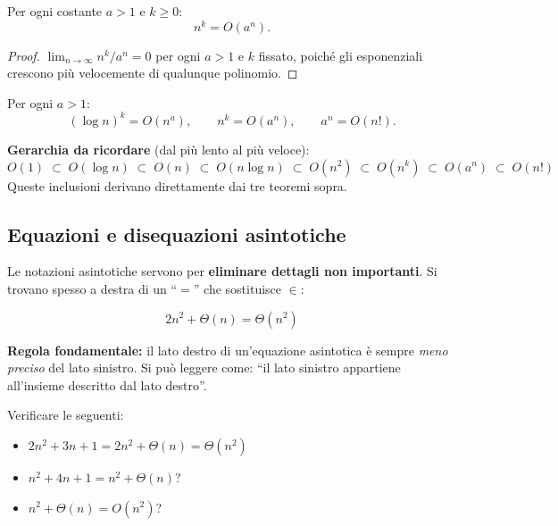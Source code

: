 \begin{teorema}
	Per ogni costante $a > 1$ e $k \ge 0$:
	\[
	n^k = O(a^n).
	\]
\end{teorema}
\begin{proof}
	$\lim_{n\to\infty} n^k / a^n = 0$ per ogni $a>1$ e $k$ fissato,
	poiché gli esponenziali crescono più velocemente di qualunque polinomio.
\end{proof}

\begin{corollario}
	Per ogni $a > 1$:
	\[
	(\log n)^k = O(n^a), \qquad
	n^k = O(a^n), \qquad
	a^n = O(n!).
	\]
\end{corollario}

\begin{hardnote}
	\textbf{Gerarchia da ricordare} (dal più lento al più veloce):
	\[
	O(1) \;\subset\; O(\log n) \;\subset\; O(n) \;\subset\;
	O(n\log n) \;\subset\; O(n^2) \;\subset\; O(n^k) \;\subset\;
	O(a^n) \;\subset\; O(n!)
	\]
	Queste inclusioni derivano direttamente dai tre teoremi sopra.
\end{hardnote}
\subsection{Equazioni e disequazioni asintotiche}

Le notazioni asintotiche servono per \textbf{eliminare dettagli non
	importanti}. Si trovano spesso a destra di un ``$=$'' che sostituisce
$\in$:

\[
2n^2 + \Theta(n) = \Theta(n^2)
\]

\begin{nota}
	\textbf{Regola fondamentale:} il lato destro di un'equazione
	asintotica è sempre \textit{meno preciso} del lato sinistro.
	Si può leggere come: ``il lato sinistro appartiene all'insieme
	descritto dal lato destro''.
\end{nota}

\begin{esempio}
	Verificare le seguenti:
	\begin{itemize}
		\item $2n^2 + 3n + 1 = 2n^2 + \Theta(n) = \Theta(n^2)$ \quad \checkmark
		\item $n^2 + 4n + 1 = n^2 + \Theta(n)$? \quad \checkmark
		\item $n^2 + \Theta(n) = O(n^2)$? \quad \checkmark
	\end{itemize}
\end{esempio}

